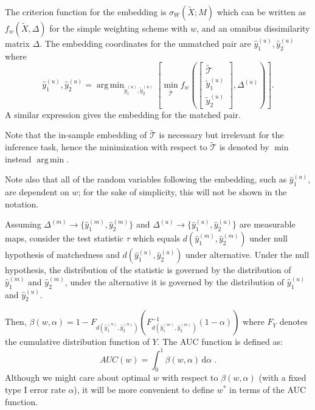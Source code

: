 \documentclass[12pt]{article} %
\DeclareMathOperator*{\argmin}{arg\,min}
\newenvironment{remark}[1][Remark]{\begin{trivlist}
\item[\hskip \labelsep {\bfseries #1}]}{\end{trivlist}}
\begin{document}


 The criterion function for the embedding is $\sigma_W(\widetilde{X};M)$ which can be written as $f_w(\widetilde{X},\Delta)$ for the simple weighting scheme with $w$, and an omnibus dissimilarity matrix $\Delta$. The embedding coordinates for the unmatched pair are  ${\hat{y}_{1}^{(u)},\hat{y}_{2}^{(u)}}$ where
 \[
{\hat{y}_{1}^{(u)},\hat{y}_{2}^{(u)}}
=\argmin_{\widetilde{y}_{1}^{(u)}, \widetilde{y}_{2}^{(u)}}\left[\min_{\widetilde{\mathcal{T}}}
{f_w\left(
\left[
\begin{array}{c}
{\widetilde{\mathcal{T}}} \\
\widetilde{y}_{1}^{(u)} \\
\widetilde{y}_{2}^{(u)}
\end {array}
\right]
,
\Delta^{(u)}
\right)
}
\right].
\]
A similar expression gives the embedding for the matched pair.
\begin{remark}
 Note that the in-sample embedding of $\widetilde{\mathcal{T}}$ is necessary but irrelevant for the inference task, hence the minimization with respect to $\widetilde{\mathcal{T}}$ is denoted by  $\min$ instead $\argmin$.
\end{remark}
\begin{remark}
 Note also that  all of the random variables following the embedding, such as $\hat{y}_{1}^{(u)}\!$,  are dependent on $w$; for the sake of simplicity, this will not be shown in the notation. 
\end{remark}

 Assuming $\Delta^{(m)} \rightarrow  \{\hat{y}_{1}^{(m)},\hat{y}_{2}^{(m)}\!\}$  and $\Delta^{(u)}\rightarrow \{\hat{y}_{1}^{(u)} , \hat{y}_{2}^{(u)}\}$ are measurable maps, consider the test statistic $\tau$ which equals $d(\hat{y}_{1}^{(m)},\hat{y}_{2}^{(m)})$ under null hypothesis of matchedness and $d(\hat{y}_{1}^{(u)},\hat{y}_{2}^{(u)})$ under alternative. Under the null hypothesis, the distribution of the statistic is governed by the distribution of $\hat{y}_{1}^{(m)}$ and $\hat{y}_{2}^{(m)}$, under the alternative it is governed by  the distribution of $\hat{y}_{1}^{(u)}$ and $\hat{y}_{2}^{(u)}$.

 Then, $\beta\left( w,\alpha\right)=1-F_{d \left(\hat{y}_{1}^{(u)},\hat{y}_{2}^{(u)}\right)}(F_{d\left(\hat{y}_{1}^{(m)},\hat{y}_{2}^{(m)}\right)}^{-1}(1-\alpha))$ where $F_Y$ denotes  the   cumulative distribution function of  $Y$.
The AUC function is defined as:  $$AUC(w)=\int_{0}^{1}\! \beta\left( w,\alpha\right)\,\mathrm{d}\alpha \; .$$
Although we might care about optimal $w$ with respect to  $\beta\left( w,\alpha\right)$ (with a fixed type I error rate $\alpha$),  it will be more convenient to define $w^*$ in terms of the AUC function.
\end{document}
